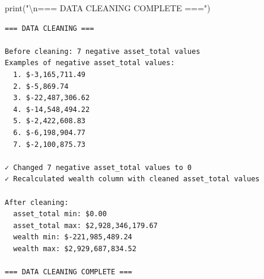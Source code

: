 \documentclass[
  letterpaper,
  DIV=11,
  numbers=noendperiod]{scrartcl}
\newenvironment{Shaded}{\begin{snugshade}}{\end{snugshade}}
\newcommand{\BuiltInTok}[1]{\textcolor[rgb]{0.00,0.23,0.31}{#1}}
\newcommand{\CharTok}[1]{\textcolor[rgb]{0.13,0.47,0.30}{#1}}
\newcommand{\NormalTok}[1]{\textcolor[rgb]{0.00,0.23,0.31}{#1}}
\newcommand{\StringTok}[1]{\textcolor[rgb]{0.13,0.47,0.30}{#1}}
\begin{document}
\begin{Shaded}
\begin{Highlighting}[]
\BuiltInTok{print}\NormalTok{(}\StringTok{"}\CharTok{\textbackslash{}n}\StringTok{=== DATA CLEANING COMPLETE ==="}\NormalTok{)}
\end{Highlighting}
\end{Shaded}

\begin{verbatim}
=== DATA CLEANING ===

Before cleaning: 7 negative asset_total values
Examples of negative asset_total values:
  1. $-3,165,711.49
  2. $-5,869.74
  3. $-22,487,306.62
  4. $-14,548,494.22
  5. $-2,422,608.83
  6. $-6,198,904.77
  7. $-2,100,875.73

✓ Changed 7 negative asset_total values to 0
✓ Recalculated wealth column with cleaned asset_total values

After cleaning:
  asset_total min: $0.00
  asset_total max: $2,928,346,179.67
  wealth min: $-221,985,489.24
  wealth max: $2,929,687,834.52

=== DATA CLEANING COMPLETE ===
\end{verbatim}
\end{document}
